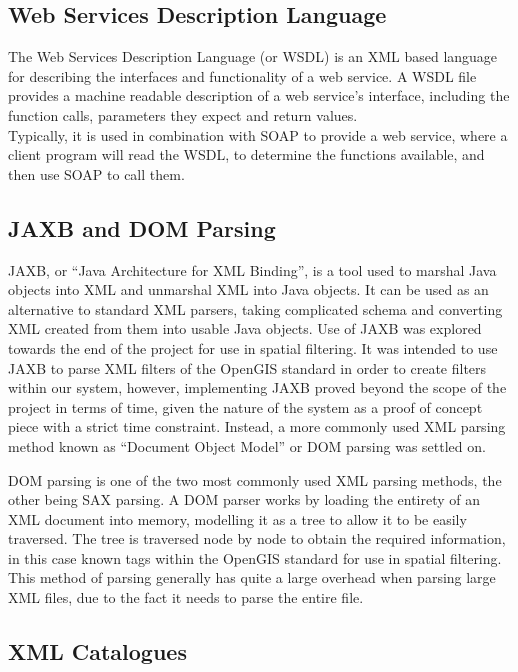 \documentclass[a4paper, 12pt, twoside]{article}
\begin{document}
\subsection{Web Services Description Language}
\label{sec:bg_wsdl}

The Web Services Description Language (or WSDL) is an XML based language for describing the interfaces and functionality of a web service. A WSDL file provides a machine readable description of a web service's interface, including the function calls, parameters they expect and return values.\\
Typically, it is used in combination with SOAP to provide a web service, where a client program will read the WSDL, to determine the functions available, and then use SOAP to call them.

\subsection{JAXB and DOM Parsing}
\label{sec:bg_parsing}

JAXB, or ``Java Architecture for XML Binding'', is a tool used to marshal Java objects into XML and unmarshal XML into Java objects. It can be used as an alternative to standard XML parsers, taking complicated schema and converting XML created from them into usable Java objects. Use of JAXB was explored towards the end of the project for use in spatial filtering. It was intended to use JAXB to parse XML filters of the OpenGIS standard in order to create filters within our system, however, implementing JAXB proved beyond the scope of the project in terms of time, given the nature of the system as a proof of concept piece with a strict time constraint. Instead, a more commonly used XML parsing method known as ``Document Object Model'' or DOM parsing was settled on.

DOM parsing is one of the two most commonly used XML parsing methods, the other being SAX parsing. A DOM parser works by loading the entirety of an XML document into memory, modelling it as a tree to allow it to be easily traversed. The tree is traversed node by node to obtain the required information, in this case known tags within the OpenGIS standard for use in spatial filtering. This method of parsing generally has quite a large overhead when parsing large XML files, due to the fact it needs to parse the entire file.

\subsection{XML Catalogues}
\label{sec:bg_catalogues}
\end{document}
